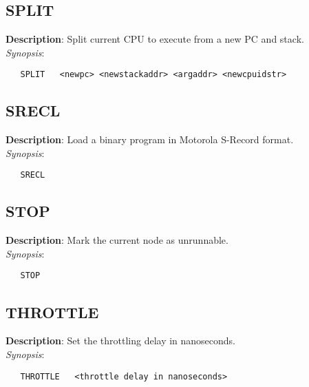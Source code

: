 \subsection{\bf SPLIT}
\label{manpages:SPLIT}
\label{manpages:split}
\vspace{-0.2in}
{\bf Description}: 	Split current CPU to execute from a new PC and stack.\\[1.5ex]
{\em Synopsis}:
\vspace{-0.2in}
\scriptsize
\begin{verbatim}
   SPLIT   <newpc> <newstackaddr> <argaddr> <newcpuidstr>
\end{verbatim}
\normalsize
\vspace{-0.2in}


\subsection{\bf SRECL}
\label{manpages:SRECL}
\label{manpages:srecl}
\vspace{-0.2in}
{\bf Description}: 	Load a binary program in Motorola S-Record format.\\[1.5ex]
{\em Synopsis}:
\vspace{-0.2in}
\scriptsize
\begin{verbatim}
   SRECL   			
\end{verbatim}
\normalsize
\vspace{-0.2in}


\subsection{\bf STOP}
\label{manpages:STOP}
\label{manpages:stop}
\vspace{-0.2in}
{\bf Description}: 	Mark the current node as unrunnable.\\[1.5ex]
{\em Synopsis}:
\vspace{-0.2in}
\scriptsize
\begin{verbatim}
   STOP   				
\end{verbatim}
\normalsize
\vspace{-0.2in}


\subsection{\bf THROTTLE}
\label{manpages:THROTTLE}
\label{manpages:throttle}
\vspace{-0.2in}
{\bf Description}: 	Set the throttling delay in nanoseconds.\\[1.5ex]
{\em Synopsis}:
\vspace{-0.2in}
\scriptsize
\begin{verbatim}
   THROTTLE   <throttle delay in nanoseconds>				
\end{verbatim}
\normalsize
\vspace{-0.2in}


